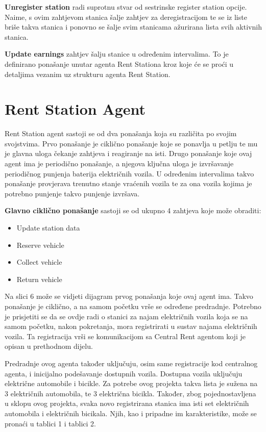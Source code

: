 \documentclass{foi}
\begin{document}
\textbf{Unregister station} radi suprotnu stvar od sestrinske register station opcije. Naime, s ovim zahtjevom stanica šalje zahtjev za deregistracijom te se iz liste briše takva stanica i ponovno se šalje svim stanicama ažurirana lista svih aktivnih stanica.

\textbf{Update earnings} zahtjev šalju stanice u određenim intervalima. To je definirano ponašanje unutar agenta Rent Stationa kroz koje će se proći u detaljima vezanim uz strukturu agenta Rent Station.

\section{Rent Station Agent}

Rent Station agent sastoji se od dva ponašanja koja su različita po svojim svojstvima. Prvo ponašanje je ciklično ponašanje koje se ponavlja u petlju te mu je glavna uloga čekanje zahtjeva i reagiranje na isti. Drugo ponašanje koje ovaj agent ima je periodično ponašanje, a njegova ključna uloga je izvršavanje periodičnog punjenja baterija električnih vozila. U određenim intervalima takvo ponašanje provjerava trenutno stanje vraćenih vozila te za ona vozila kojima je potrebno punjenje takvo punjenje izvršava.

\textbf{Glavno ciklično ponašanje} sastoji se od ukupno 4 zahtjeva koje može obraditi:
\begin{itemize}
	\item Update station data
	\item Reserve vehicle
	\item Collect vehicle
	\item Return vehicle
\end{itemize}

Na slici 6 može se vidjeti dijagram prvog ponašanja koje ovaj agent ima. Takvo ponašanje je ciklično, a na samom početku vrše se određene predradnje. Potrebno je prisjetiti se da se ovdje radi o stanici za najam električnih vozila koja se na samom početku, nakon pokretanja,  mora registrirati u sustav najama električnih vozila. Ta registracija vrši se komunikacijom sa Central Rent agentom koji je opisan u prethodnom dijelu. 

Predradnje ovog agenta također uključuju, osim same registracije kod centralnog agenta, i inicijalno podešavanje dostupnih vozila. Dostupna vozila uključuju električne automobile i bicikle. Za potrebe ovog projekta takva lista je sužena na 3 električnih automobila, te 3 električna bicikla. Također, zbog pojednostavljena u sklopu ovog projekta, svaka novo registrirana stanica ima isti set električnih automobila i električnih bicikala. Njih, kao i pripadne im karakteristike, može se pronaći u tablici 1 i tablici 2.
\end{document}
